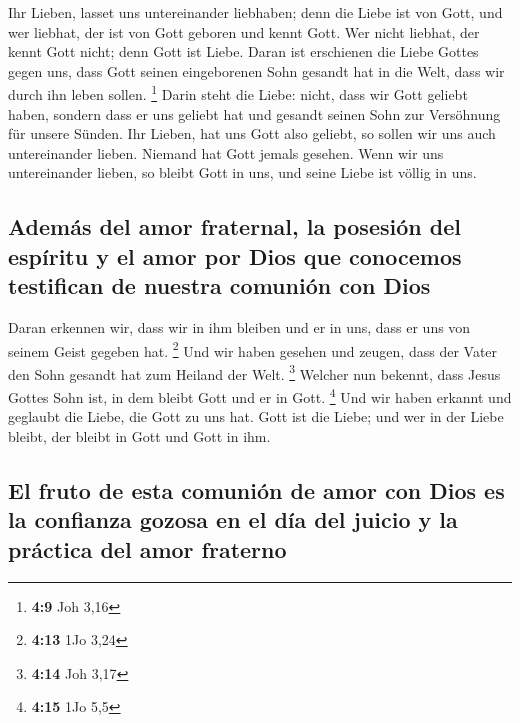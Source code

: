  Ihr Lieben, lasset uns untereinander liebhaben; denn die
Liebe ist von Gott, und wer liebhat, der ist von Gott geboren und kennt
Gott.  Wer nicht liebhat, der kennt Gott nicht; denn Gott
ist Liebe.  Daran ist erschienen die Liebe Gottes gegen
uns, dass Gott seinen eingeborenen Sohn gesandt hat in die Welt, dass
wir durch ihn leben sollen. \footnote{\textbf{4:9} Joh 3,16}
 Darin steht die Liebe: nicht, dass wir Gott geliebt
haben, sondern dass er uns geliebt hat und gesandt seinen Sohn zur
Versöhnung für unsere Sünden.  Ihr Lieben, hat uns Gott
also geliebt, so sollen wir uns auch untereinander lieben.
 Niemand hat Gott jemals gesehen. Wenn wir uns
untereinander lieben, so bleibt Gott in uns, und seine Liebe ist völlig
in uns.

\hypertarget{ademuxe1s-del-amor-fraternal-la-posesiuxf3n-del-espuxedritu-y-el-amor-por-dios-que-conocemos-testifican-de-nuestra-comuniuxf3n-con-dios}{%
\subsection{Además del amor fraternal, la posesión del espíritu y el
amor por Dios que conocemos testifican de nuestra comunión con
Dios}\label{ademuxe1s-del-amor-fraternal-la-posesiuxf3n-del-espuxedritu-y-el-amor-por-dios-que-conocemos-testifican-de-nuestra-comuniuxf3n-con-dios}}

 Daran erkennen wir, dass wir in ihm bleiben und er in
uns, dass er uns von seinem Geist gegeben hat. \footnote{\textbf{4:13}
  1Jo 3,24}  Und wir haben gesehen und zeugen, dass der
Vater den Sohn gesandt hat zum Heiland der Welt. \footnote{\textbf{4:14}
  Joh 3,17}  Welcher nun bekennt, dass Jesus Gottes Sohn
ist, in dem bleibt Gott und er in Gott. \footnote{\textbf{4:15} 1Jo 5,5}
 Und wir haben erkannt und geglaubt die Liebe, die Gott
zu uns hat. Gott ist die Liebe; und wer in der Liebe bleibt, der bleibt
in Gott und Gott in ihm.

\hypertarget{el-fruto-de-esta-comuniuxf3n-de-amor-con-dios-es-la-confianza-gozosa-en-el-duxeda-del-juicio-y-la-pruxe1ctica-del-amor-fraterno}{%
\subsection{El fruto de esta comunión de amor con Dios es la confianza
gozosa en el día del juicio y la práctica del amor
fraterno}\label{el-fruto-de-esta-comuniuxf3n-de-amor-con-dios-es-la-confianza-gozosa-en-el-duxeda-del-juicio-y-la-pruxe1ctica-del-amor-fraterno}}

